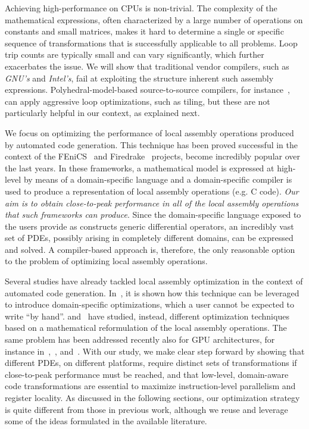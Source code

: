 Achieving high-performance on CPUs is non-trivial. The complexity of the mathematical expressions, often characterized by a large number of operations on constants and small matrices, makes it hard to determine a single or specific sequence of transformations that is successfully applicable to all problems. Loop trip counts are typically small and can vary significantly, which further exacerbates the issue. We will show that traditional vendor compilers, such as \emph{GNU's} and \emph{Intel's}, fail at exploiting the structure inherent such assembly expressions. Polyhedral-model-based source-to-source compilers, for instance~\cite{pluto}, can apply aggressive loop optimizations, such as tiling, but these are not particularly helpful in our context, as explained next. 

We focus on optimizing the performance of local assembly operations produced by automated code generation. This technique has been proved successful in the context of the FEniCS~\citep{Fenics} and Firedrake~\citep{firedrake-code} projects, become incredibly popular over the last years. In these frameworks, a mathematical model is expressed at high-level by means of a domain-specific language and a domain-specific compiler is used to produce a representation of local assembly operations (e.g. C code). \textit{Our aim is to obtain close-to-peak performance in all of the local assembly operations that such frameworks can produce}. Since the domain-specific language exposed to the users provide as constructs generic differential operators, an incredibly vast set of PDEs, possibly arising in completely different domains, can be expressed and solved. A compiler-based approach is, therefore, the only reasonable option to the problem of optimizing local assembly operations. 

Several studies have already tackled local assembly optimization in the context of automated code generation. In~\cite{quadrature-olegaard}, it is shown how this technique can be leveraged to introduce domain-specific optimizations, which a user cannot be expected to write ``by hand''. \cite{tensor-kirby} and~\cite{francis} have studied, instead, different optimization techniques based on a mathematical reformulation of the local assembly operations. The same problem has been addressed recently also for GPU architectures, for instance in~\cite{petsc-integration-gpu},~\cite{klockner-dg}, and~\cite{bana-ho-fem}. With our study, we make clear step forward by showing that different PDEs, on different platforms, require distinct sets of transformations if close-to-peak performance must be reached, and that low-level, domain-aware code transformations are essential to maximize instruction-level parallelism and register locality. As discussed in the following sections, our optimization strategy is quite different from those in previous work, although we reuse and leverage some of the ideas formulated in the available literature. 

